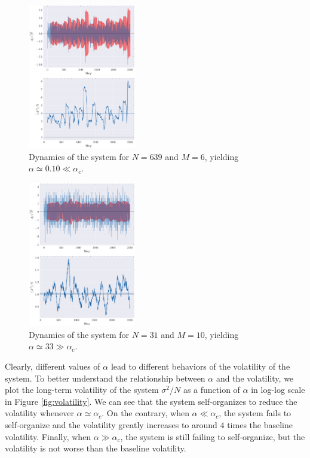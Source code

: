 \documentclass[a4paper, amsfonts, amssymb, amsmath, reprint, showkeys, nofootinbib, twoside]{revtex4-1}
\begin{document}
\begin{figure}[H]
    \centering
    \includegraphics[width=0.42\textwidth]{figures/M6_N639.png}
    \caption{Dynamics of the system for $N=639$ and $M=6$, yielding $\alpha \simeq 0.10 \ll \alpha_c$.}
    \label{fig:dynamics2}
\end{figure}

\begin{figure}[H]
    \centering
    \includegraphics[width=0.42\textwidth]{figures/M10_N31.png}
    \caption{Dynamics of the system for $N=31$ and $M=10$, yielding $\alpha \simeq 33 \gg \alpha_c$.}
    \label{fig:dynamics3}
\end{figure}

Clearly, different values of $\alpha$ lead to different behaviors of the volatility of the system. To better understand the relationship between $\alpha$ and the volatility, we plot the long-term volatility of the system $\sigma^2/N$ as a function of $\alpha$ in log-log scale in Figure \ref{fig:volatility}. We can see that the system self-organizes to reduce the volatility whenever $\alpha \simeq \alpha_c$. On the contrary, when $\alpha \ll \alpha_c$, the system fails to self-organize and the volatility greatly increases to around $4$ times the baseline volatility. Finally, when $\alpha \gg \alpha_c$, the system is still failing to self-organize, but the volatility is not worse than the baseline volatility.
\end{document}

